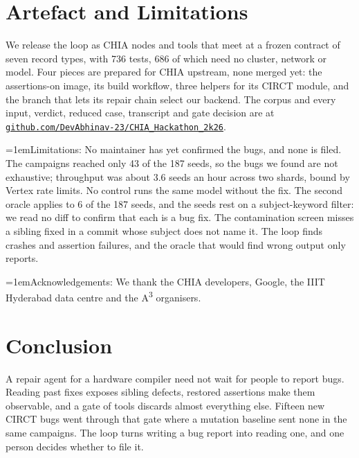 \documentclass[conference]{IEEEtran}
\newcommand{\pointhead}[1]{\par\noindent\hangindent=1em\hangafter=1\makebox[1em][l]{\textbullet}#1:}
\begin{document}
\section{Artefact and Limitations}
We release the loop as CHIA nodes and tools that meet at a frozen contract of
seven record types, with 736 tests, 686 of which need no cluster, network or
model. %
Four pieces are prepared for CHIA upstream, none merged yet: the
assertions-on image, its build workflow,
three helpers for its CIRCT module, and the branch that lets its repair chain
select our backend. %
The corpus and every input, verdict, reduced case, transcript and gate decision
are at\\\href{https://github.com/DevAbhinav-23/CHIA_Hackathon_2k26}{\textcolor{blue!70!black}{\nolinkurl{github.com/DevAbhinav-23/CHIA_Hackathon_2k26}}}.

\pointhead{Limitations} No maintainer has yet confirmed the bugs, and none is
filed. The campaigns reached only 43 of the 187 seeds, so the bugs we found are
not exhaustive; throughput was about 3.6 seeds an hour across two shards, bound
by Vertex rate limits. No control runs the same model without the fix. %
The second oracle applies to 6 of the 187 seeds, and the seeds rest on a
subject-keyword filter: we read no diff to confirm that each is a bug fix. %
The contamination screen misses a sibling fixed in a commit whose subject does
not name it. The loop finds crashes and assertion failures, and the oracle that
would find wrong output only reports.

\pointhead{Acknowledgements} We thank the CHIA developers, Google, the IIIT
Hyderabad data centre and the A\textsuperscript{3} organisers.

\section{Conclusion}
A repair agent for a hardware compiler need not wait for people to report bugs.
Reading past fixes exposes sibling defects, restored assertions make them
observable, and a gate of tools discards almost everything else. Fifteen new
CIRCT bugs went through that gate where a mutation baseline sent none in the
same campaigns. The loop turns writing a bug report into reading one, and one person decides
whether to file it.



\end{document}
